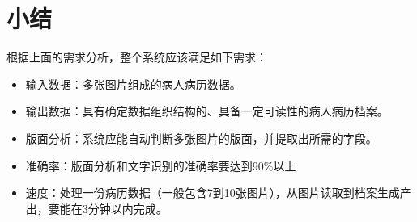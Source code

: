 \section{小结}
根据上面的需求分析，整个系统应该满足如下需求：
\begin{itemize}
	\item 输入数据：多张图片组成的病人病历数据。
	\item 输出数据：具有确定数据组织结构的、具备一定可读性的病人病历档案。
	\item 版面分析：系统应能自动判断多张图片的版面，并提取出所需的字段。
	\item 准确率：版面分析和文字识别的准确率要达到90\%以上
	\item 速度：处理一份病历数据（一般包含7到10张图片），从图片读取到档案生成产出，要能在3分钟以内完成。
\end{itemize}
